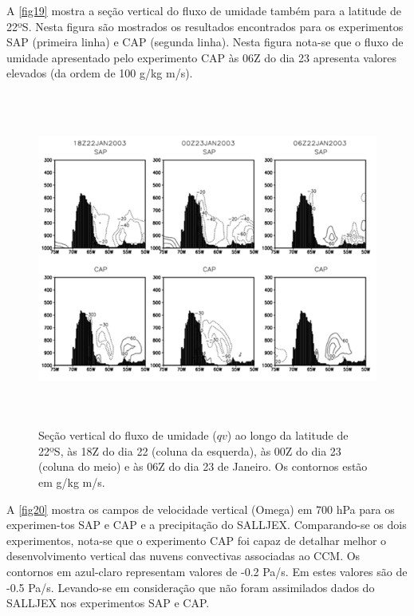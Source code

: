 A \autoref{fig19} mostra a seção vertical do fluxo de umidade também para a latitude de 22ºS. Nesta figura são mostrados os resultados encontrados para os experimentos SAP (primeira linha) e CAP (segunda linha). Nesta figura nota-se que o fluxo de umidade apresentado pelo experimento CAP às 06Z do dia 23 apresenta valores elevados (da ordem de 100 g/kg m/s).

\begin{figure}[!hbp]
\includegraphics[height=11cm]{./figs/secvert.png}
\caption{Seção vertical do fluxo de umidade ($qv$) ao longo da latitude de 22ºS, às 18Z do dia 22 (coluna da esquerda), às 00Z do dia 23 (coluna do meio) e às 06Z do dia 23 de Janeiro. Os contornos estão em g/kg m/s.}
\label{fig19}
\end{figure}

A \autoref{fig20} mostra os campos de velocidade vertical (Omega) em 700 hPa para os experimen-tos SAP e CAP e a precipitação do SALLJEX. Comparando-se os dois experimentos, nota-se que o experimento CAP foi capaz de detalhar melhor o desenvolvimento vertical das nuvens convectivas associadas ao CCM. Os contornos em azul-claro representam valores de -0.2 Pa/s. Em  estes valores são de -0.5 Pa/s. Levando-se em consideração que não foram assimilados dados do SALLJEX nos experimentos SAP e CAP.
 
